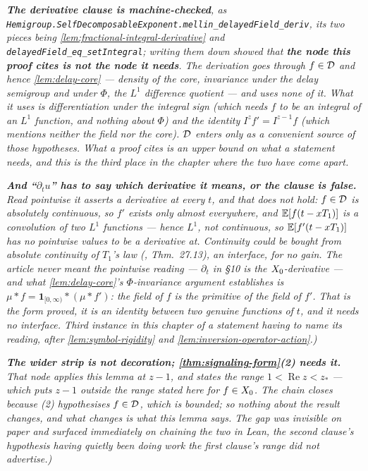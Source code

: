 \emph{\textbf{The derivative clause is machine-checked}, as
\texttt{Hemigroup.SelfDecomposableExponent.mellin\_delayedField\_deriv}, its two pieces being
\ref{lem:fractional-integral-derivative} and \texttt{delayedField\_eq\_setIntegral}; writing them
down showed that \textbf{the node this proof cites is not the node it needs}. The derivation goes through $f \in \mathcal{D}$ and hence
\ref{lem:delay-core} --- density of the core, invariance under the delay semigroup and under
$\Phi$, the $L^1$ difference quotient --- and uses none of it. What it uses is differentiation
under the integral sign (which needs $f$ to be an integral of an $L^1$ function, and nothing about
$\Phi$) and the identity $I^zf' = I^{z-1}f$ (which mentions neither the field nor the core). $\mathcal{D}$
enters only as a convenient source of those hypotheses. \emph{What a proof cites is an upper bound
on what a statement needs}, and this is the third place in the chapter where the two have come
apart.}

\emph{\textbf{And ``$\partial_t u$'' has to say which derivative it means, or the clause is false.}
Read pointwise it asserts a derivative at every $t$, and that does not hold: $f \in \mathcal{D}$ is
absolutely continuous, so $f' $ exists only almost everywhere, and $\mathbb{E}[f(t-xT_1)]$ is a
convolution of two $L^1$ functions --- hence $L^1$, not continuous, so $\mathbb{E}[f'(t-xT_1)]$ has no
pointwise values to be a derivative \emph{at}. Continuity could be bought from absolute continuity
of $T_1$'s law (, Thm.~27.13), an interface, for no gain. The article never
meant the pointwise reading --- $\partial_t$ in \S10 is the $X_0$-derivative --- and what
\ref{lem:delay-core}'s $\Phi$-invariance argument establishes is
$\mu * f = \mathbf{1}_{[0,\infty)} * (\mu * f')$: the field of $f$ is the \emph{primitive} of the
field of $f'$. That is the form proved, it is an identity between two genuine functions of $t$, and
it needs no interface. Third instance in this chapter of a statement having to name its reading,
after \ref{lem:symbol-rigidity} and \ref{lem:inversion-operator-action}.)}

\emph{\textbf{The wider strip is not decoration; \ref{thm:signaling-form}(2) needs it.} That node
applies this lemma at $z-1$, and states the range $1 < \operatorname{Re} z < z_*$ --- which puts
$z - 1$ outside the range stated here for $f \in X_0$. The chain closes because (2) hypothesises
$f \in \mathcal{D}$, which is bounded; so nothing about the result changes, and what changes is what
this lemma \emph{says}. The gap was invisible on paper and surfaced immediately on chaining the
two in Lean, the second clause's hypothesis having quietly been doing work the first clause's
range did not advertise.)}

